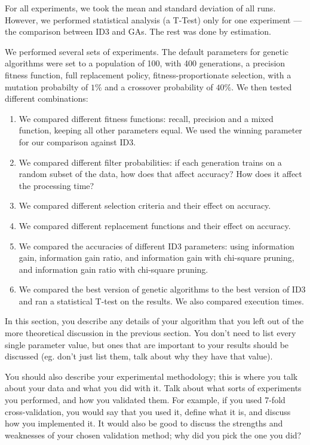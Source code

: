 \documentclass[12pt, letterpaper]{article}
\begin{document}
For all experiments, we took the mean and standard deviation of all runs. However, we performed statistical analysis (a T-Test) only for one experiment --- the comparison between ID3 and GAs. The rest was done by estimation.

We performed several sets of experiments. The default parameters for genetic algorithms were set to a population of 100, with 400 generations, a precision fitness function, full replacement policy, fitness-proportionate selection, with a mutation probabilty of $1\%$ and a crossover probability of $40\%$. We then tested different combinations:

\begin{enumerate}
    \item We compared different fitness functions: recall, precision and a mixed function, keeping all other parameters equal. We used the winning parameter for our comparison against ID3.
    \item We compared different filter probabilities: if each generation trains on a random subset of the data, how does that affect accuracy? How does it affect the processing time?
    \item We compared different selection criteria and their effect on accuracy.
    \item We compared different replacement functions and their effect on accuracy.
    \item We compared the accuracies of different ID3 parameters: using information gain, information gain ratio, and information gain with chi-square pruning, and information gain ratio with chi-square pruning.
    \item We compared the best version of genetic algorithms to the best version of ID3 and ran a statistical T-test on the results. We also compared execution times.
\end{enumerate}

In this section, you describe any details of your algorithm that you left out of
the more theoretical discussion in the previous section.  You don't need to list
every single parameter value, but ones that are important to your results should
be discussed (eg. don't just list them, talk about why they have that value).

You should also describe your experimental methodology; this is where you talk
about your data and what you did with it.  Talk about what sorts of experiments
you performed, and how you validated them.  For example, if you used 7-fold
cross-validation, you would say that you used it, define what it is, and discuss
how you implemented it.  It would also be good to discuss the strengths and
weaknesses of your chosen validation method; why did you pick the one you did?
\end{document}
